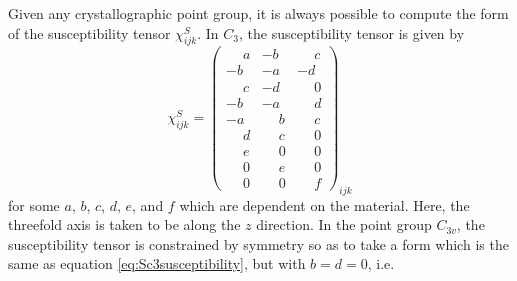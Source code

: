 Given any crystallographic point group, it is always possible to compute the form of the susceptibility tensor $\chi^S_{ijk}$.
In $C_3$, the susceptibility tensor is given by~\cite{boyd}
\begin{equation}
\label{eq:Sc3susceptibility}
\chi^S_{ijk} = \begin{pmatrix}
\phantom{-}a & -b & \phantom{-}c\\
-b & -a & -d\\
\phantom{-}c & -d & \phantom{-}0\\
\hline
-b & -a & \phantom{-}d\\
-a & \phantom{-}b & \phantom{-}c\\
\phantom{-}d & \phantom{-}c & \phantom{-}0\\
\hline
\phantom{-}e & \phantom{-}0 & \phantom{-}0\\
\phantom{-}0 & \phantom{-}e & \phantom{-}0\\
\phantom{-}0 & \phantom{-}0 & \phantom{-}f
\end{pmatrix}_{ijk}
\end{equation}
for some $a$, $b$, $c$, $d$, $e$, and $f$ which are dependent on the material.
Here, the threefold axis is taken to be along the $z$ direction.
In the point group $C_{3v}$, the susceptibility tensor is constrained by symmetry so as to take a form which is the same as equation \ref{eq:Sc3susceptibility}, but with $b = d = 0$, i.e.

